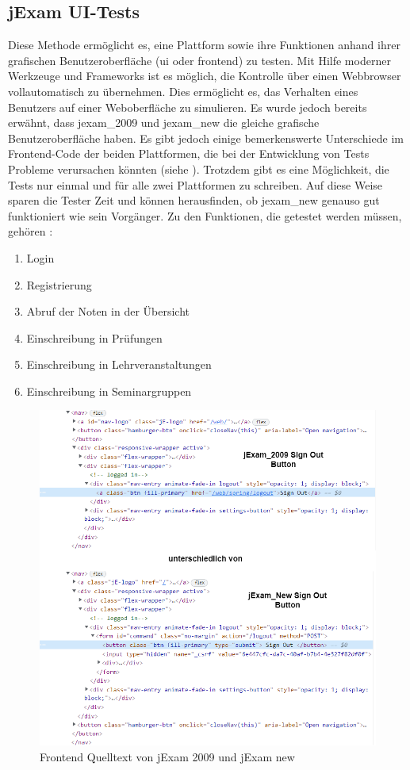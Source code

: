 \subsection{jExam UI-Tests}\label{subsec:jexam-ui-tests}

Diese Methode erm\"oglicht es, eine Plattform sowie ihre Funktionen anhand
ihrer grafischen Benutzeroberfl\"ache (\acs{ui} oder \gls{frontend}) zu
testen. Mit Hilfe moderner Werkzeuge und Frameworks ist es m\"oglich, die
Kontrolle \"uber einen Webbrowser vollautomatisch zu \"ubernehmen. Dies
erm\"oglicht es, das Verhalten eines Benutzers auf einer Weboberfl\"ache zu
simulieren. Es wurde jedoch bereits erw\"ahnt, dass \gls{jexam_2009} und \gls{jexam_new}
die gleiche grafische Benutzeroberfl\"ache haben. Es gibt jedoch einige
bemerkenswerte Unterschiede im Frontend-Code der beiden Plattformen,
die bei der Entwicklung von Tests Probleme verursachen k\"onnten
(siehe ). Trotzdem gibt es eine
M\"oglichkeit, die Tests nur einmal und f\"ur alle zwei
Plattformen zu schreiben. Auf diese Weise sparen die Tester Zeit und k\"onnen
herausfinden, ob \gls{jexam_new} genauso gut funktioniert wie sein Vorg\"anger. Zu den Funktionen, die getestet werden müssen, gehören :
\begin{enumerate}
    \item Login
    \item Registrierung
    \item Abruf der Noten in der Übersicht
    \item Einschreibung in Prüfungen
    \item Einschreibung in Lehrveranstaltungen
    \item Einschreibung in Seminargruppen
\end{enumerate}

\noindent
\begin{figure}[H]
    \centering
    \includegraphics[scale=0.5]{images/jexam_compare}
    \caption{Frontend Quelltext von jExam 2009 und jExam new} \label{fig:old_new}
\end{figure}

